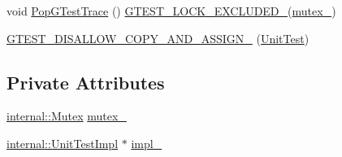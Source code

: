\begin{DoxyCompactItemize}
\item 
void \hyperlink{classtesting_1_1UnitTest_a70b3e3282778bc9a36520fe0a8be3c57}{Pop\+G\+Test\+Trace} () \hyperlink{gtest-port_8h_a69abff5a4efdd07bd5faebe3dd318d06}{G\+T\+E\+S\+T\+\_\+\+L\+O\+C\+K\+\_\+\+E\+X\+C\+L\+U\+D\+E\+D\+\_\+}(\hyperlink{classtesting_1_1UnitTest_abb94ef45cf0ab43be81ac6d5b1364132}{mutex\+\_\+})
\item 
\hyperlink{classtesting_1_1UnitTest_a1e04cfb4f837cea288a98f2a64c43bba}{G\+T\+E\+S\+T\+\_\+\+D\+I\+S\+A\+L\+L\+O\+W\+\_\+\+C\+O\+P\+Y\+\_\+\+A\+N\+D\+\_\+\+A\+S\+S\+I\+G\+N\+\_\+} (\hyperlink{classtesting_1_1UnitTest}{Unit\+Test})
\end{DoxyCompactItemize}
\subsection*{Private Attributes}
\begin{DoxyCompactItemize}
\item 
\hyperlink{classtesting_1_1internal_1_1Mutex}{internal\+::\+Mutex} \hyperlink{classtesting_1_1UnitTest_abb94ef45cf0ab43be81ac6d5b1364132}{mutex\+\_\+}
\item 
\hyperlink{classtesting_1_1internal_1_1UnitTestImpl}{internal\+::\+Unit\+Test\+Impl} $\ast$ \hyperlink{classtesting_1_1UnitTest_a834685f92009d21b21a7307f4cbfb6e5}{impl\+\_\+}
\end{DoxyCompactItemize}
